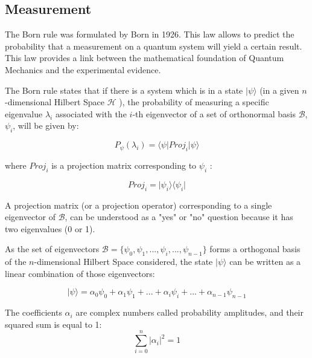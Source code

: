 \subsection{Measurement}
\label{subsubsec:bornrule}

The Born rule was formulated by Born in 1926. This law allows to predict the probability that a measurement on a quantum system will yield a certain result. This law provides a link between the mathematical foundation of Quantum Mechanics and the experimental evidence\cite{VanRijsbergen2004}\cite{Landsman2009}. 


The Born rule states that if there is a system which is in a state $\vert \psi \rangle$  (in a given $n$-dimensional Hilbert Space $\mathcal{H}$ ), the probability of measuring a specific eigenvalue $\lambda_{i}$ associated with the $i$-th eigenvector of a set of orthonormal basis $\mathcal{B}$, $\psi_{i}$, will be given by\cite{VanRijsbergen2004}: 


\begin{equation}
\label{eq_born_rule}
P_{\psi}(\lambda_{i}) = \langle \psi\vert Proj_{i}\vert\psi\rangle
\end{equation}

where $Proj_{i}$ is a projection matrix corresponding to $\psi_{i}$ :

 \begin{equation}
\label{eq_born_rule_1}
Proj_{i} = \vert\psi_{i}\rangle \langle \psi_{i}\vert
\end{equation}

A projection matrix (or a projection operator) corresponding to a single eigenvector of $\mathcal{B}$, can be understood as a "yes" or "no" question because it has  two eigenvalues (0 or 1).

As the set of eigenvectors $\mathcal{B}=\{ \psi_{0}, \psi_{1}, ..., \psi_{i},..., \psi_{n-1}\}$ forms a orthogonal basis of the $n$-dimensional Hilbert Space considered, the state $\vert \psi \rangle$
can be written as a linear combination of those eigenvectors:

 \begin{equation}
\label{eq_born_rule_lala}
\vert \psi \rangle = \alpha_{0}\psi_{0}+ \alpha_{1}\psi_{1}+ ...+\alpha_{i}\psi_{i}+...+\alpha_{n-1}\psi_{n-1}
\end{equation}

The coefficients $\alpha_{i}$ are complex numbers called probability amplitudes, and their squared sum is equal to 1: 
\begin{equation}
\sum_{i=0}^{n} \vert \alpha_{i}\vert^{2} = 1
\end{equation}

